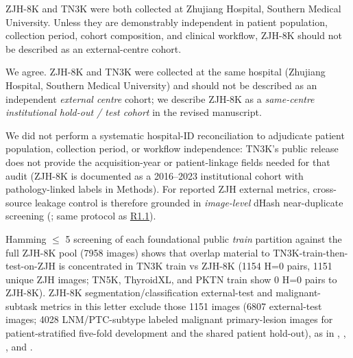 \label{rev:R2.4}
\begin{reviewercomment}
ZJH-8K and TN3K were both collected at Zhujiang Hospital, Southern Medical University. Unless they are demonstrably independent in patient population, collection period, cohort composition, and clinical workflow, ZJH-8K should not be described as an external-centre cohort.
\end{reviewercomment}
\begin{authorresponse}
We agree. ZJH-8K and TN3K were collected at the same hospital (Zhujiang Hospital, Southern Medical University) and should not be described as an independent \emph{external centre} cohort; we describe ZJH-8K as a \emph{same-centre institutional hold-out / test cohort} in the revised manuscript.\par
We did not perform a systematic hospital-ID reconciliation to adjudicate patient population, collection period, or workflow independence: TN3K's public release does not provide the acquisition-year or patient-linkage fields needed for that audit (ZJH-8K is documented as a 2016--2023 institutional cohort with pathology-linked labels in Methods). For reported ZJH external metrics, cross-source leakage control is therefore grounded in \emph{image-level} dHash near-duplicate screening (; same protocol as \hyperref[rev:R1.1]{R1.1}).\par
Hamming $\leq$ 5 screening of each foundational public \emph{train} partition against the full ZJH-8K pool (7958 images) shows that overlap material to TN3K-train-then-test-on-ZJH is concentrated in TN3K train vs ZJH-8K (1154 H=0 pairs, 1151 unique ZJH images; TN5K, ThyroidXL, and PKTN train show 0 H=0 pairs to ZJH-8K). ZJH-8K segmentation/classification external-test and malignant-subtask metrics in this letter exclude those 1151 images (6807 external-test images; 4028 LNM/PTC-subtype labeled malignant primary-lesion images for patient-stratified five-fold development and the shared patient hold-out), as in , , , and .\par
\par
\end{authorresponse}

